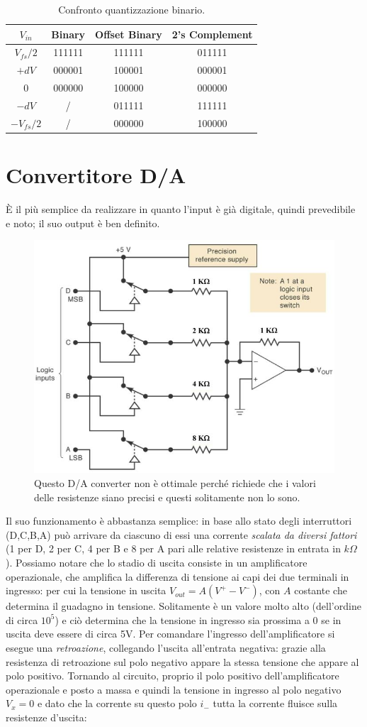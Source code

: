 \documentclass[
]{book}
\begin{document}
\begin{table}[H]
\centering
\begin{tabular}{cccc}
\hline
$V_{in}$ & Binary & Offset Binary & 2's Complement \\ 
\hline
$V_{fs}/2$ & 111111 & 111111 & 011111 \\
\hline
$+dV$ & 000001 & 100001 & 000001 \\
0 & 000000 & 100000 & 000000 \\
$-dV$ & / & 011111 & 111111 \\
\hline
$-V_{fs}/2$ & / & 000000 & 100000
\end{tabular}
\caption{Confronto quantizzazione binario.}
\end{table}

\section{Convertitore D/A}\label{convertitore-da}

È il più semplice da realizzare in quanto l'input è già digitale, quindi
prevedibile e noto; il suo output è ben definito.

\begin{figure}
\centering
\includegraphics[width=0.4\linewidth,height=\textheight,keepaspectratio]{immagini/41.png}
\caption{Questo D/A converter non è ottimale perché richiede che i
valori delle resistenze siano precisi e questi solitamente non lo sono.}
\end{figure}

Il suo funzionamento è abbastanza semplice: in base allo stato degli
interruttori (D,C,B,A) può arrivare da ciascuno di essi una corrente
\emph{scalata da diversi fattori} (1 per D, 2 per C, 4 per B e 8 per A
pari alle relative resistenze in entrata in \(k\Omega\)). Possiamo
notare che lo stadio di uscita consiste in un amplificatore
operazionale, che amplifica la differenza di tensione ai capi dei due
terminali in ingresso: per cui la tensione in uscita
\(V_{out}=A(V^{+}-V^{-})\), con \(A\) costante che determina il guadagno
in tensione. Solitamente è un valore molto alto (dell'ordine di circa
\(10^5\)) e ciò determina che la tensione in ingresso sia prossima a 0
se in uscita deve essere di circa 5V. Per comandare l'ingresso
dell'amplificatore si esegue una \emph{retroazione}, collegando l'uscita
all'entrata negativa: grazie alla resistenza di retroazione sul polo
negativo appare la stessa tensione che appare al polo positivo.\newline
Tornando al circuito, proprio il polo positivo dell'amplificatore
operazionale e posto a massa e quindi la tensione in ingresso al polo
negativo \(V_{x}=0\) e dato che la corrente su questo polo \(i_{-}\)
tutta la corrente fluisce sulla resistenze d'uscita:
\end{document}
